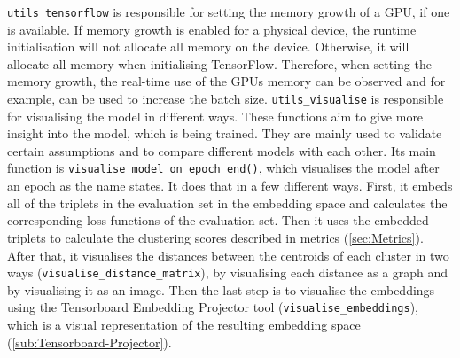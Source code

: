 \newline
\texttt{utils\_tensorflow} is responsible for setting the memory growth of a \gls{GPU}, if one is available. If memory growth is enabled for a physical device, the runtime initialisation will not allocate all memory on the device. Otherwise, it will allocate all memory when initialising TensorFlow. Therefore, when setting the memory growth, the real-time use of the \glspl{GPU} memory can be observed and for example, can be used to increase the batch size.
\newline
\newline
\texttt{utils\_visualise} is responsible for visualising the model in different ways. These functions aim to give more insight into the model, which is being trained. They are mainly used to validate certain assumptions and to compare different models with each other. Its main function is \texttt{visualise\_model\_on\_epoch\_end()}, which visualises the model after an epoch as the name states. It does that in a few different ways. First, it embeds all of the triplets in the evaluation set in the embedding space and calculates the corresponding loss functions of the evaluation set. Then it uses the embedded triplets to calculate the clustering scores described in metrics (\ref{sec:Metrics}). After that, it visualises the distances between the centroids of each cluster in two ways (\texttt{visualise\_distance\_matrix}), by visualising each distance as a graph and by visualising it as an image. Then the last step is to visualise the embeddings using the Tensorboard Embedding Projector tool (\texttt{visualise\_embeddings}), which is a visual representation of the resulting embedding space (\ref{sub:Tensorboard-Projector}).

